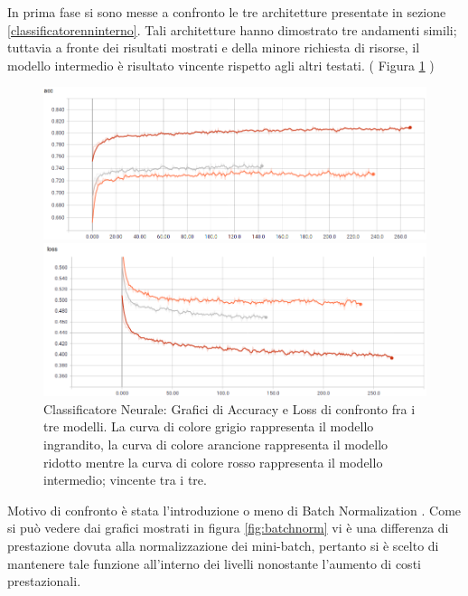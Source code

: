 In prima fase si sono messe a confronto le tre architetture presentate in sezione \ref{classificatorenninterno}. Tali architetture hanno dimostrato tre andamenti simili; tuttavia a fronte dei risultati mostrati e della minore richiesta di risorse, il modello intermedio è risultato vincente rispetto agli altri testati. ( Figura \ref{fig:cfrmlp} )

\begin{figure}[!bp] 
\centering
	\begin{minipage}[t]{\linewidth}
		\includegraphics[width=\linewidth]{figures/MLP1.png}
	\end{minipage}\hfill
	\begin{minipage}[b]{\linewidth}
		\includegraphics[width=\linewidth]{figures/MLP2.png}
	\end{minipage}
	\caption{Classificatore Neurale: Grafici di Accuracy e Loss di confronto fra i tre modelli. La curva di colore grigio rappresenta il modello ingrandito, la curva di colore arancione rappresenta il modello ridotto mentre la curva di colore rosso rappresenta il modello intermedio; vincente tra i tre. \label{fig:cfrmlp}}
\end{figure}

Motivo di confronto è stata l'introduzione o meno di Batch Normalization \cite{1502.03167}. Come si può vedere dai grafici mostrati in figura \ref{fig:batchnorm} vi è una differenza di prestazione dovuta alla normalizzazione dei mini-batch, pertanto si è scelto di mantenere tale funzione all'interno dei livelli nonostante l'aumento di costi prestazionali.

